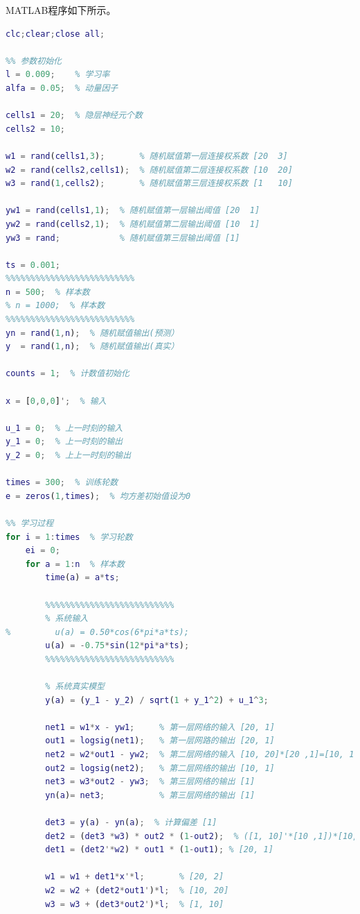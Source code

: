 \documentclass{article}
\begin{document}
MATLAB程序如下所示。
\begin{lstlisting}[caption=ex1\_bp.m, language=matlab]
% ex1_bp.m
clc;clear;close all;

%% 参数初始化
l = 0.009;    % 学习率
alfa = 0.05;  % 动量因子

cells1 = 20;  % 隐层神经元个数
cells2 = 10;

w1 = rand(cells1,3);       % 随机赋值第一层连接权系数 [20  3]
w2 = rand(cells2,cells1);  % 随机赋值第二层连接权系数 [10  20]
w3 = rand(1,cells2);       % 随机赋值第三层连接权系数 [1   10]

yw1 = rand(cells1,1);  % 随机赋值第一层输出阈值 [20  1]
yw2 = rand(cells2,1);  % 随机赋值第二层输出阈值 [10  1]
yw3 = rand;            % 随机赋值第三层输出阈值 [1]

ts = 0.001;
%%%%%%%%%%%%%%%%%%%%%%%%%%
n = 500;  % 样本数
% n = 1000;  % 样本数
%%%%%%%%%%%%%%%%%%%%%%%%%%
yn = rand(1,n);  % 随机赋值输出(预测）
y  = rand(1,n);  % 随机赋值输出(真实）

counts = 1;  % 计数值初始化

x = [0,0,0]';  % 输入

u_1 = 0;  % 上一时刻的输入
y_1 = 0;  % 上一时刻的输出
y_2 = 0;  % 上上一时刻的输出

times = 300;  % 训练轮数
e = zeros(1,times);  % 均方差初始值设为0

%% 学习过程
for i = 1:times  % 学习轮数
    ei = 0;
    for a = 1:n  % 样本数
        time(a) = a*ts;
        
        %%%%%%%%%%%%%%%%%%%%%%%%%%
        % 系统输入
%         u(a) = 0.50*cos(6*pi*a*ts);
        u(a) = -0.75*sin(12*pi*a*ts);
        %%%%%%%%%%%%%%%%%%%%%%%%%%
        
        % 系统真实模型
        y(a) = (y_1 - y_2) / sqrt(1 + y_1^2) + u_1^3;
        
        net1 = w1*x - yw1;     % 第一层网络的输入 [20, 1]
        out1 = logsig(net1);   % 第一层网路的输出 [20, 1]
        net2 = w2*out1 - yw2;  % 第二层网络的输入 [10, 20]*[20 ,1]=[10, 1]
        out2 = logsig(net2);   % 第二层网络的输出 [10, 1]
        net3 = w3*out2 - yw3;  % 第三层网络的输出 [1]
        yn(a)= net3;           % 第三层网络的输出 [1]
        
        det3 = y(a) - yn(a);  % 计算偏差 [1]
        det2 = (det3 *w3) * out2 * (1-out2);  % ([1, 10]'*[10 ,1])*[10, 1] = [10, 1]
        det1 = (det2'*w2) * out1 * (1-out1); % [20, 1]
        
        w1 = w1 + det1*x'*l;       % [20, 2]
        w2 = w2 + (det2*out1')*l;  % [10, 20]
        w3 = w3 + (det3*out2')*l;  % [1, 10]
        

\end{lstlisting}
\end{document}
